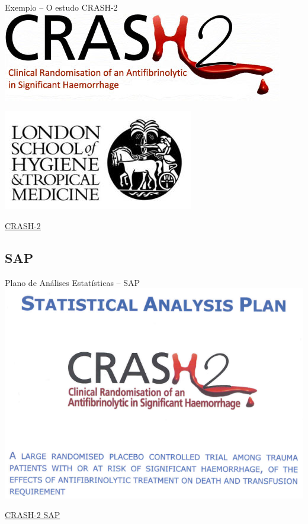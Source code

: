 \documentclass{beamer}
\begin{document}
\begin{frame}{Exemplo -- O estudo CRASH-2}
  \centering
  \includegraphics[width=.8\textwidth]{Etapas/C2logoNew}

  \bigskip
  \includegraphics[width=.4\textwidth]{Etapas/Lshtm_newlogo}

  \vfill
  \scriptsize
  \hfill \href{http://www.crash2.lshtm.ac.uk/}{CRASH-2}
\end{frame}

\subsection{SAP}

\begin{frame}{Plano de Análises Estatísticas -- SAP}
  \centering
  \includegraphics[width=.9\textwidth]{Etapas/CRASH-SAP}

  \vfill
  \scriptsize
  \hfill \href{http://www.crash2.lshtm.ac.uk/Images/SAP.pdf}{CRASH-2 SAP}
\end{frame}
\end{document}
